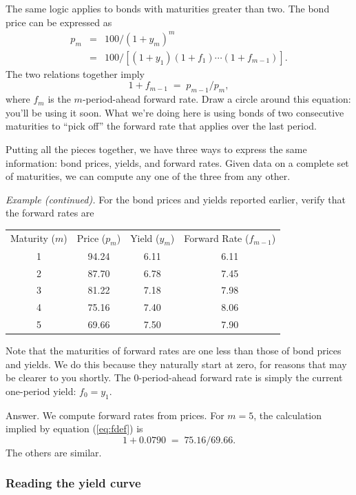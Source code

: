 \documentclass[letterpaper,12pt]{article}
\begin{document}
The same logic applies to bonds with maturities greater than two.
The bond price can be expressed as
\begin{eqnarray*}
        p_m &=& 100/(1+y_m)^m \\
            &=& 100/ [(1+y_1)(1+f_1) \cdots (1+f_{m-1})] .
\end{eqnarray*}
The two relations together imply
\begin{equation}
    1+f_{m-1} \;=\; p_{m-1}/p_{m} ,
    \label{eq:fdef}
\end{equation}
where $f_m$ is the $m$-period-ahead forward rate.  Draw a circle
around this equation: you'll be using it soon.  What we're doing
here is using bonds of two consecutive maturities to ``pick off''
the forward rate that applies over the last period.


Putting all the pieces together, we have three ways to express the
same information:  bond prices, yields, and forward rates. Given
data on a complete set of maturities, we can compute any one of
the three from any other.


{\it Example (continued).\/} For the bond prices and yields
reported earlier, verify that the forward rates are
%
\begin{center}
\begin{tabular}{cccc}
  Maturity ($m$)  &  Price ($p_m$)  &  Yield ($y_m$)  & Forward Rate ($f_{m-1}$) \\
     1      &  94.24  &   6.11 &   6.11    \\
     2      &  87.70  &   6.78 &   7.45         \\
     3      &  81.22  &   7.18 &   7.98     \\
     4      &  75.16  &   7.40 &   8.06       \\
     5      &  69.66  &   7.50 &   7.90
\end{tabular}
\end{center}
Note that the maturities of forward rates are one less than those
of bond prices and yields.  We do this because they naturally
start at zero, for reasons that may be clearer to you shortly. The
0-period-ahead forward rate is simply the current one-period
yield:   $f_0 = y_1$.

Answer.  We compute forward rates from prices.  For $m=5$, the
calculation implied by equation (\ref{eq:fdef}) is
\[
    1 + 0.0790 \;=\; 75.16/69.66.
\]
The others are similar.


\subsubsection*{Reading the yield curve}
\end{document}
